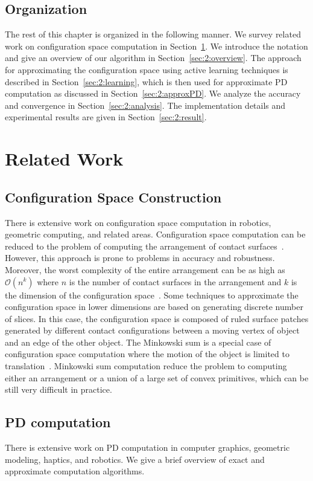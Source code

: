 \subsection{Organization}
The rest of this chapter is organized in the following manner. We survey related work on configuration space computation in Section~\ref{sec:2:related}. We introduce the notation and give an overview of our algorithm in Section~\ref{sec:2:overview}. The approach for approximating the configuration space using active learning techniques is described in Section~\ref{sec:2:learning}, which is then used for approximate PD computation as discussed in Section~\ref{sec:2:approxPD}. We analyze the accuracy and convergence in Section~\ref{sec:2:analysis}. The implementation details and experimental results are given in Section~\ref{sec:2:result}.

\section{Related Work}
\label{sec:2:related}
\subsection{Configuration Space Construction}
There is extensive work on configuration space computation in robotics, geometric computing, and related areas.
Configuration space computation can be reduced to the problem of computing the arrangement of contact surfaces~\cite{Varadhan:2006:TPA}.
However, this approach is prone to problems in accuracy and robustness. Moreover, the worst complexity of the entire arrangement can be as high as $\mathcal O(n^k)$ where $n$ is the number of contact surfaces in the arrangement and $k$ is the dimension of the configuration space~\cite{Goodman:Rourke:1997}. Some techniques to approximate the configuration space in lower dimensions are based on generating discrete number of slices\cite{Sacks:SCS:1997}. In this case, the configuration space is composed of ruled surface patches generated by different contact configurations between a moving vertex of object and an edge of the other object. The Minkowski sum is a special case of configuration space computation where the motion of the object is limited to translation~\cite{Leonidas:CCRS:1987,LPT:SpatialPlanning:1983}.
Minkowski sum computation reduce the problem to computing either an arrangement or a union of a large set of convex primitives, which can be still very difficult in practice.

\subsection{PD computation}
There is extensive work on PD computation in computer graphics,
geometric modeling, haptics, and robotics. We give a brief
overview of exact and approximate computation algorithms.

